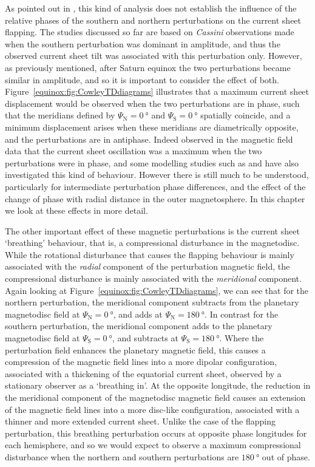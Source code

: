 As pointed out in \citet{provan2009}, this kind of analysis does not establish the influence of the relative phases of the southern and northern perturbations on the current sheet flapping. The studies discussed so far are based on \textit{Cassini} observations made when the southern perturbation was dominant in amplitude, and thus the observed current sheet tilt was associated with this perturbation only. However, as previously mentioned, after Saturn equinox the two perturbations became similar in amplitude, and so it is important to consider the effect of both. Figure~\ref{equinox:fig:CowleyTDdiagrams} illustrates that a maximum current sheet displacement would be observed when the two perturbations are in phase, such that the meridians defined by $\Psi_\mathrm{N} = \SI{0}{\degree}$ and $\Psi_\mathrm{S} = \SI{0}{\degree}$ spatially coincide, and a minimum displacement arises when these meridians are diametrically opposite, and the perturbations are in antiphase. Indeed \citet{provan2012} observed in the magnetic field data that the current sheet oscillation was a maximum when the two perturbations were in phase, and some modelling studies such as \citet{jiaandkivelson2012} and \citet{cowley2017a} have also investigated this kind of behaviour. However there is still much to be understood, particularly for intermediate perturbation phase differences, and the effect of the change of phase with radial distance in the outer magnetosphere. In this chapter we look at these effects in more detail.

The other important effect of these magnetic perturbations is the current sheet `breathing' behaviour, that is, a compressional disturbance in the magnetodisc. While the rotational disturbance that causes the flapping behaviour is mainly associated with the \textit{radial} component of the perturbation magnetic field, the compressional disturbance is mainly associated with the \textit{meridional} component. Again looking at Figure~\ref{equinox:fig:CowleyTDdiagrams}, we can see that for the northern perturbation, the meridional component subtracts from the planetary magnetodisc field at $\Psi_\mathrm{N} = \SI{0}{\degree}$, and adds at $\Psi_\mathrm{N} = \SI{180}{\degree}$. In contrast for the southern perturbation, the meridional component adds to the planetary magnetodisc field at $\Psi_\mathrm{S} = \SI{0}{\degree}$, and subtracts at $\Psi_\mathrm{S} = \SI{180}{\degree}$. Where the perturbation field enhances the planetary magnetic field, this causes a compression of the magnetic field lines into a more dipolar configuration, associated with a thickening of the equatorial current sheet, observed by a stationary observer as a `breathing in'. At the opposite longitude, the reduction in the meridional component of the magnetodisc magnetic field causes an extension of the magnetic field lines into a more disc-like configuration, associated with a thinner and more extended current sheet. Unlike the case of the flapping perturbation, this breathing perturbation occurs at opposite phase longitudes for each hemisphere, and so we would expect to observe a maximum compressional disturbance when the northern and southern perturbations are $\SI{180}{\degree}$ out of phase.

